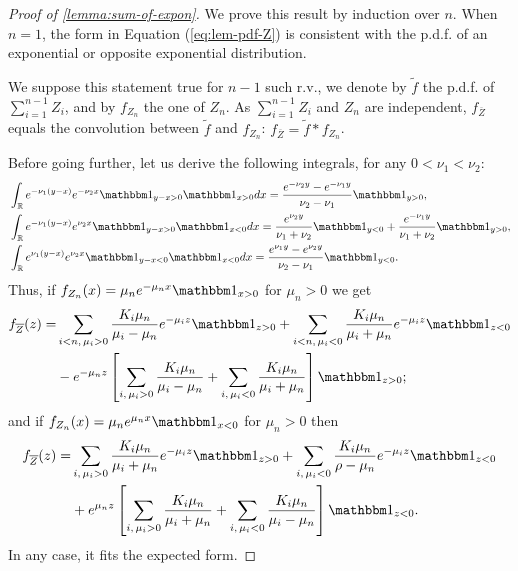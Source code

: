 \begin{proof}[{Proof of \cref{lemma:sum-of-expon}}]
We prove this result by induction over $n$. When $n=1$, the form in Equation (\ref{eq:lem-pdf-Z}) is consistent with the p.d.f. of an exponential or opposite exponential distribution.

We suppose this statement true for $n-1$ such r.v., we denote by $\tilde f$ the p.d.f. of $\sum_{i=1}^{n-1}Z_i$, and by $f_{Z_n}$ the one of $Z_n$. As $\sum_{i=1}^{n-1}Z_i$ and $Z_n$ are independent, $f_{\overline{Z}}$ equals the convolution between $\tilde f$ and $f_{Z_n}$: $f_{\overline{Z}}=\tilde f\ast f_{Z_n}$.

Before going further, let us derive the following integrals, for any $0<\nu_1<\nu_2$:
\begin{align}
        \nonumber&\int_\RR e^{-\nu_1(y-x)}e^{-\nu_2 x}\indic_{y-x>0}\indic_{x>0}dx = \frac{e^{-\nu_2 y}-e^{-\nu_1 y}}{\nu_2-\nu_1}\indic_{y>0},\\
        &\int_\RR e^{-\nu_1(y-x)}e^{\nu_2 x}\indic_{y-x>0}\indic_{x<0} dx = \frac{e^{\nu_2y}}{\nu_1+\nu_2}\indic_{y<0} + \frac{e^{-\nu_1y}}{\nu_1+\nu_2}\indic_{y>0},\\
        &\int_\RR e^{\nu_1(y-x)}e^{\nu_2 x}\indic_{y-x<0}\indic_{x<0}dx = \frac{e^{\nu_1y} - e^{\nu_2y}}{\nu_2-\nu_1}\indic_{y<0}.\nonumber
    \end{align}
Thus, if $f_{Z_n}(x) = \mu_n e^{-\mu_n x}\indic_{x>0}$ for  $\mu_n>0$ we get
    \begin{align}
        f_{\overline{Z}}(z) =&  \sum_{i<n,\,\mu_i>0} \frac{K_i\mu_n}{\mu_i-\mu_n}e^{-\mu_i z}\indic_{z>0}  + \sum_{i<n,\,\mu_i<0}\frac{K_i\mu_n}{\mu_i+\mu_n}e^{-\mu_i z}\indic_{z<0}
        \\
        &- e^{-\mu_n z}\left[\sum_{i,\,\mu_i>0}\frac{K_i\mu_n}{\mu_i-\mu_n} + \sum_{i,\,\mu_i<0}\frac{K_i\mu_n}{\mu_i+\mu_n} \right]\indic_{z>0};\nonumber
    \end{align}
and if $f_{Z_n}(x) = \mu_n e^{\mu_n x}\indic_{x<0}$ for  $\mu_n>0$ then 
    \begin{align}
        f_{\overline{Z}}(z) =&  \sum_{i,\,\mu_i>0} \frac{K_i\mu_n}{\mu_i+\mu_n}e^{-\mu_i z}\indic_{z>0}  + \sum_{i,\,\mu_i<0}\frac{K_i\mu_n}{\rho-\mu_n}e^{-\mu_i z}\indic_{z<0}\\
        &+ e^{\mu_n z}\left[\sum_{i,\,\mu_i>0}\frac{K_i\mu_n}{\mu_i+\mu_n} + \sum_{i,\,\mu_i<0}\frac{K_i\mu_n}{\mu_i-\mu_n} \right]\indic_{z<0}.\nonumber
    \end{align}
In any case, it fits the expected form.
\end{proof}

